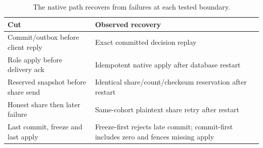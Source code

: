 \begin{table}[t]
\centering
\caption{The native path recovers from failures at each tested boundary.}
\label{tab:failure-cuts}
\footnotesize
\begin{tabularx}{\columnwidth}{@{}YY@{}}
\toprule
Cut & Observed recovery \\
\midrule
Commit/outbox before client reply & Exact committed decision replay \\
Role apply before delivery ack & Idempotent native apply after database restart \\
Reserved snapshot before share send & Identical share/count/checksum reservation after restart \\
Honest share then later failure & Same-cohort plaintext share retry after restart \\
Last commit, freeze and last apply & Freeze-first rejects late commit; commit-first includes zero and fences missing apply \\
\bottomrule
\end{tabularx}
\end{table}
